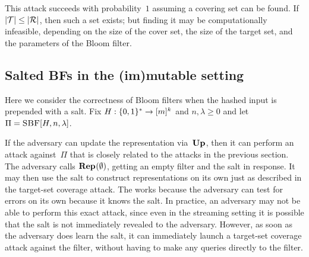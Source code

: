 This  attack succeeds with probability~$1$ assuming a covering set can
be found.  If $|\mathcal{T}| \leq |\mathcal{R}|$, then such a set exists; but finding it may be
computationally infeasible, depending on the size of the cover set, the size of
the target set, and the parameters of the Bloom filter.
%
%
%



\subsection{Salted BFs in the (im)mutable setting}\label{sec:sbf}
%
Here we consider the correctness of Bloom filters when the hashed input is
prepended with a salt.
%
Fix $H:\{0,1\}^*\to[m]^k$ and $n,\lambda\geq0$ and let
$\Pi = \textnormal{\textsc{SBF}}[H,n,\lambda]$.

If the adversary can update the representation via~$\textup{\textbf{Up}}\hspace{0.5pt}$, then it can perform
an  attack against~$\Pi$ that is closely related to the attacks in the
previous section.  The adversary calls $\textup{\textbf{Rep}}\hspace{0.5pt}(\emptyset)$, getting an empty
filter and the salt in response.  It may then use the salt to construct
representations on its own just as described in the target-set coverage attack.
%
The works because the adversary can test for errors on its own because it knows
the salt.  In practice, an adversary may not be able to perform this exact
attack, since even in the streaming setting it is possible that the salt is not
immediately revealed to the adversary. However, as soon as the adversary does
learn the salt, it can immediately launch a target-set coverage attack against the filter,
without having to make any queries directly to the filter.
%


